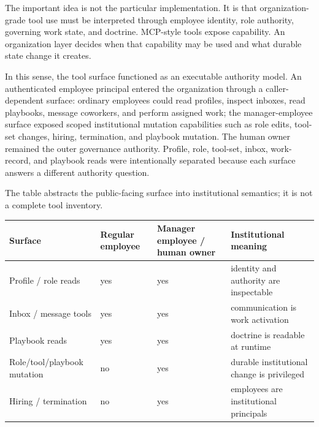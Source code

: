 \documentclass[
]{article}
\newcounter{none} %
\begin{document}
The important idea is not the particular implementation. It is that organization-grade tool use must be interpreted through employee identity, role authority, governing work state, and doctrine. MCP-style tools expose capability. An organization layer decides when that capability may be used and what durable state change it creates.

In this sense, the tool surface functioned as an executable authority model. An authenticated employee principal entered the organization through a caller-dependent surface: ordinary employees could read profiles, inspect inboxes, read playbooks, message coworkers, and perform assigned work; the manager-employee surface exposed scoped institutional mutation capabilities such as role edits, tool-set changes, hiring, termination, and playbook mutation. The human owner remained the outer governance authority. Profile, role, tool-set, inbox, work-record, and playbook reads were intentionally separated because each surface answers a different authority question.

The table abstracts the public-facing surface into institutional semantics; it is not a complete tool inventory.

{\def\LTcaptype{none} %
\begin{longtable}[]{@{}
  >{\raggedright\arraybackslash}p{}
  >{\raggedright\arraybackslash}p{}
  >{\raggedright\arraybackslash}p{}
  >{\raggedright\arraybackslash}p{}@{}}
\toprule\noalign{}
\begin{minipage}[b]{\linewidth}\raggedright
Surface
\end{minipage} & \begin{minipage}[b]{\linewidth}\raggedright
Regular employee
\end{minipage} & \begin{minipage}[b]{\linewidth}\raggedright
Manager employee / human owner
\end{minipage} & \begin{minipage}[b]{\linewidth}\raggedright
Institutional meaning
\end{minipage} \\
\midrule\noalign{}
\endhead
\bottomrule\noalign{}
\endlastfoot
Profile / role reads & yes & yes & identity and authority are inspectable \\
Inbox / message tools & yes & yes & communication is work activation \\
Playbook reads & yes & yes & doctrine is readable at runtime \\
Role/tool/playbook mutation & no & yes & durable institutional change is privileged \\
Hiring / termination & no & yes & employees are institutional principals \\
\end{longtable}
}
\end{document}
